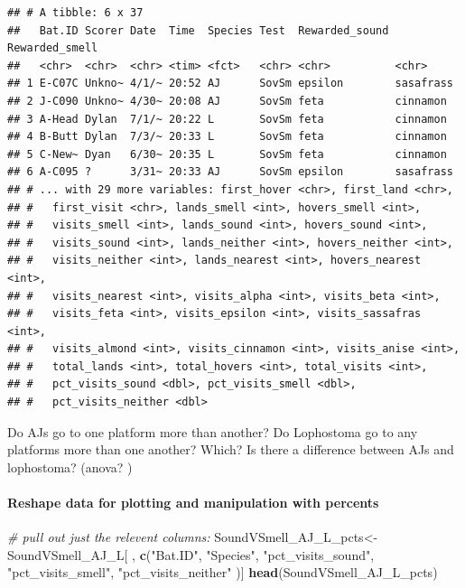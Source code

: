 \documentclass[]{article}
\newenvironment{Shaded}{\begin{snugshade}}{\end{snugshade}}
\newcommand{\KeywordTok}[1]{\textcolor[rgb]{0.13,0.29,0.53}{\textbf{{#1}}}}
\newcommand{\StringTok}[1]{\textcolor[rgb]{0.31,0.60,0.02}{{#1}}}
\newcommand{\CommentTok}[1]{\textcolor[rgb]{0.56,0.35,0.01}{\textit{{#1}}}}
\newcommand{\NormalTok}[1]{{#1}}
\let\oldparagraph\paragraph
\renewcommand{\paragraph}[1]{\oldparagraph{#1}\mbox{}}
\begin{document}
\begin{verbatim}
## # A tibble: 6 x 37
##   Bat.ID Scorer Date  Time  Species Test  Rewarded_sound Rewarded_smell
##   <chr>  <chr>  <chr> <tim> <fct>   <chr> <chr>          <chr>         
## 1 E-C07C Unkno~ 4/1/~ 20:52 AJ      SovSm epsilon        sasafrass     
## 2 J-C090 Unkno~ 4/30~ 20:08 AJ      SovSm feta           cinnamon      
## 3 A-Head Dylan  7/1/~ 20:22 L       SovSm feta           cinnamon      
## 4 B-Butt Dylan  7/3/~ 20:33 L       SovSm feta           cinnamon      
## 5 C-New~ Dyan   6/30~ 20:35 L       SovSm feta           cinnamon      
## 6 A-C095 ?      3/31~ 20:33 AJ      SovSm epsilon        sasafrass     
## # ... with 29 more variables: first_hover <chr>, first_land <chr>,
## #   first_visit <chr>, lands_smell <int>, hovers_smell <int>,
## #   visits_smell <int>, lands_sound <int>, hovers_sound <int>,
## #   visits_sound <int>, lands_neither <int>, hovers_neither <int>,
## #   visits_neither <int>, lands_nearest <int>, hovers_nearest <int>,
## #   visits_nearest <int>, visits_alpha <int>, visits_beta <int>,
## #   visits_feta <int>, visits_epsilon <int>, visits_sassafras <int>,
## #   visits_almond <int>, visits_cinnamon <int>, visits_anise <int>,
## #   total_lands <int>, total_hovers <int>, total_visits <int>,
## #   pct_visits_sound <dbl>, pct_visits_smell <dbl>,
## #   pct_visits_neither <dbl>
\end{verbatim}

Do AJs go to one platform more than another? Do Lophostoma go to any
platforms more than one another? Which? Is there a difference between
AJs and lophostoma? (anova? )

\paragraph{Reshape data for plotting and manipulation with
percents}\label{reshape-data-for-plotting-and-manipulation-with-percents-2}

\begin{Shaded}
\begin{Highlighting}[]
\CommentTok{# pull out just the relevent columns: }
\NormalTok{SoundVSmell_AJ_L_pcts<-}\StringTok{ }\NormalTok{SoundVSmell_AJ_L[ , }\KeywordTok{c}\NormalTok{(}\StringTok{"Bat.ID"}\NormalTok{, }\StringTok{"Species"}\NormalTok{, }\StringTok{"pct_visits_sound"}\NormalTok{, }\StringTok{"pct_visits_smell"}\NormalTok{, }\StringTok{"pct_visits_neither"} \NormalTok{)]}
\KeywordTok{head}\NormalTok{(SoundVSmell_AJ_L_pcts)}
\end{Highlighting}
\end{Shaded}
\end{document}
